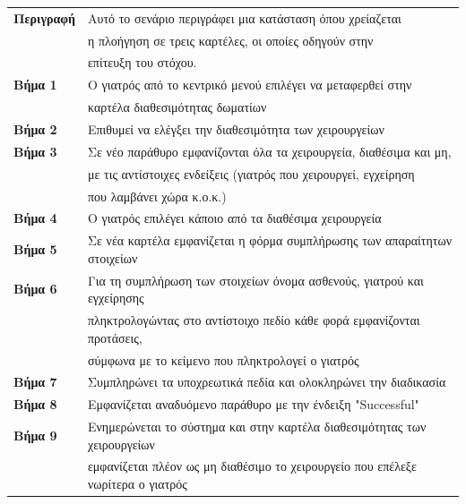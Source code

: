 \documentclass{article}
\newcommand\T{\rule{0pt}{2.6ex}}       %
\newcommand\B{\rule[-1.2ex]{0pt}{0pt}}
\begin{document}
 \begin{center}
     \begin{tabular}{|l|l|}
     \hline
      \textbf{Περιγραφή} & Αυτό το σενάριο περιγράφει μια κατάσταση όπου χρείαζεται \T \\& η πλοήγηση σε τρεις καρτέλες, οι οποίες οδηγούν στην \\& επίτευξη του στόχου. \B \\ 
      \hline
      \textbf{Βήμα 1} & Ο γιατρός από το κεντρικό μενού επιλέγει να μεταφερθεί στην \T \\& καρτέλα διαθεσιμότητας δωματίων \B \\
      \hline
      \textbf{Βήμα 2} & Επιθυμεί να ελέγξει την διαθεσιμότητα των χειρουργείων \T\B \\ 
      \hline
      \textbf{Βήμα 3} & Σε νέο παράθυρο εμφανίζονται όλα τα χειρουργεία, διαθέσιμα και μη, \T \\& με τις αντίστοιχες ενδείξεις (γιατρός που χειρουργεί, εγχείρηση \\&  που λαμβάνει χώρα κ.ο.κ.) \B \\
      \hline
      \textbf{Βήμα 4} & Ο γιατρός επιλέγει κάποιο από τα διαθέσιμα χειρουργεία \T\B \\
      \hline
      \textbf{Βήμα 5} & Σε νέα καρτέλα εμφανίζεται η φόρμα συμπλήρωσης των απαραίτητων στοιχείων \T\B \\
      \hline
      \textbf{Βήμα 6} & Για τη συμπλήρωση των στοιχείων όνομα ασθενούς, γιατρού και εγχείρησης \T \\& πληκτρολογώντας στο αντίστοιχο πεδίο κάθε φορά εμφανίζονται προτάσεις, \\& σύμφωνα με το κείμενο που πληκτρολογεί ο γιατρός \B \\
      \hline      
      \textbf{Βήμα 7} & Συμπληρώνει τα υποχρεωτικά πεδία και ολοκληρώνει την διαδικασία\T\B \\
      \hline
      \textbf{Βήμα 8} & Εμφανίζεται αναδυόμενο παράθυρο με την ένδειξη "Successful" \T\B \\
      \hline
      \textbf{Βήμα 9} & Ενημερώνεται το σύστημα και στην καρτέλα διαθεσιμότητας των χειρουργείων \T \\& εμφανίζεται πλέον ως μη διαθέσιμο το χειρουργείο που επέλεξε νωρίτερα ο γιατρός \B \\
      \hline
     \end{tabular}
 \end{center}
 
\end{document}
